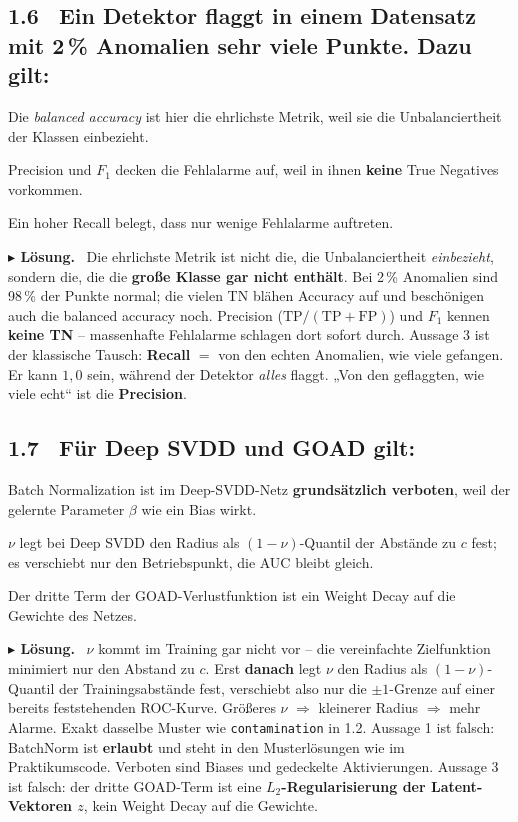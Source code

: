 \documentclass[10pt,a4paper]{article}
\newcommand{\mcbox}{\raisebox{-1pt}{\fbox{\rule{0pt}{7pt}\rule{7pt}{0pt}}}\hspace{6pt}}
\newcommand{\mcja}{\raisebox{-1pt}{{\fboxrule0.9pt\fcolorbox{loesfarbe}{white}{%
  \rule{0pt}{7pt}\makebox[7pt][c]{\color{loesfarbe}\scriptsize\bfseries X}}}}\hspace{6pt}}
\newenvironment{loes}%
  {\par\vspace{2pt}\begingroup\small\noindent\textbf{\color{loesfarbe}$\blacktriangleright$ Lösung.}\ }%
  {\endgroup\par\vspace{5pt}}
\begin{document}
\subsection*{1.6 \ Ein Detektor flaggt in einem Datensatz mit 2\,\% Anomalien sehr viele Punkte.
Dazu gilt:}
\mcbox Die \emph{balanced accuracy} ist hier die ehrlichste Metrik, weil sie die Unbalanciertheit
der Klassen einbezieht.

\mcja Precision und $F_1$ decken die Fehlalarme auf, weil in ihnen \textbf{keine} True Negatives
vorkommen.

\mcbox Ein hoher Recall belegt, dass nur wenige Fehlalarme auftreten.

\begin{loes}
Die ehrlichste Metrik ist nicht die, die Unbalanciertheit \emph{einbezieht}, sondern die, die die
\textbf{große Klasse gar nicht enthält}. Bei 2\,\% Anomalien sind 98\,\% der Punkte normal; die
vielen TN blähen Accuracy auf und beschönigen auch die balanced accuracy noch. Precision
($\text{TP}/(\text{TP}+\text{FP})$) und $F_1$ kennen \textbf{keine TN} -- massenhafte Fehlalarme
schlagen dort sofort durch.
Aussage 3 ist der klassische Tausch: \textbf{Recall} $=$ von den echten Anomalien, wie viele
gefangen. Er kann $1{,}0$ sein, während der Detektor \emph{alles} flaggt. „Von den geflaggten, wie
viele echt`` ist die \textbf{Precision}.
\end{loes}

\subsection*{1.7 \ Für Deep SVDD und GOAD gilt:}
\mcbox Batch Normalization ist im Deep-SVDD-Netz \textbf{grundsätzlich verboten}, weil der
gelernte Parameter $\beta$ wie ein Bias wirkt.

\mcja $\nu$ legt bei Deep SVDD den Radius als $(1-\nu)$-Quantil der Abstände zu $c$ fest; es
verschiebt nur den Betriebspunkt, die AUC bleibt gleich.

\mcbox Der dritte Term der GOAD-Verlustfunktion ist ein Weight Decay auf die Gewichte des Netzes.

\begin{loes}
$\nu$ kommt im Training gar nicht vor -- die vereinfachte Zielfunktion minimiert nur den Abstand zu
$c$. Erst \textbf{danach} legt $\nu$ den Radius als $(1-\nu)$-Quantil der Trainingsabstände fest,
verschiebt also nur die $\pm1$-Grenze auf einer bereits feststehenden ROC-Kurve. Größeres $\nu$
$\Rightarrow$ kleinerer Radius $\Rightarrow$ mehr Alarme. Exakt dasselbe Muster wie
\texttt{contamination} in 1.2.
Aussage 1 ist falsch: BatchNorm ist \textbf{erlaubt} und steht in den Musterlösungen wie im
Praktikumscode. Verboten sind Biases und gedeckelte Aktivierungen.
Aussage 3 ist falsch: der dritte GOAD-Term ist eine \textbf{$L_2$-Regularisierung der
Latent-Vektoren $z$}, kein Weight Decay auf die Gewichte.
\end{loes}
\end{document}
